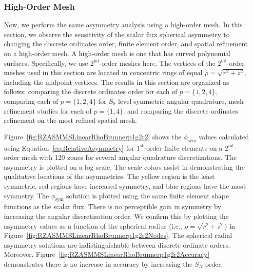\documentclass[12pt]{article}
\begin{document}
\FloatBarrier

\subsubsection{High-Order Mesh}
\label{subsec:HOMesh}
Now, we perform the same asymmetry analysis using a high-order mesh. In this section, we observe the sensitivity of the scalar flux spherical asymmetry to changing the discrete ordinates order, finite element order, and spatial refinement on a high-order mesh. A high-order mesh is one that has curved polynomial surfaces. Specifically, we use $2^\text{nd}$-order meshes here. The vertices of the $2^\text{nd}$-order meshes used in this section are located in concentric rings of equal $\rho=\sqrt{r^2+z^2}$, including the midpoint vertices. The results in this section are organized as follows: comparing the discrete ordinates order for each of $p=\{1,2,4\}$, comparing each of $p=\{1,2,4\}$ for $S_8$ level symmetric angular quadrature, mesh refinement studies for each of $p=\{1,4\}$, and comparing the discrete ordinates refinement on the most refined spatial mesh.

Figure~\ref{fig:RZASMMSLinearRhoBrunnerp1g2r2} shows the $\phi_\text{sym}$ values calculated using Equation~\ref{eq:RelativeAsymmetry} for $1^\text{st}$-order finite elements on a $2^\text{nd}$-order mesh with 120 zones for several angular quadrature discretizations. The asymmetry is plotted on a log scale. The scale colors assist in demonstrating the qualitative locations of the asymmetries. The yellow region is the least symmetric, red regions have increased symmetry, and blue regions have the most symmetry. The $\phi_\text{sym}$ solution is plotted using the same finite element shape functions as the scalar flux. There is no perceptible gain in symmetry by increasing the angular discretization order. We confirm this by plotting the asymmetry values as a function of the spherical radius (i.e., $\rho=\sqrt{r^2+z^2}$) in Figure~\ref{fig:RZASMMSLinearRhoBrunnerp1g2r2Nodes}. The spherical radial asymmetry solutions are indistinguishable between discrete ordinate orders. Moreover, Figure~\ref{fig:RZASMMSLinearRhoBrunnerp1g2r2Accuracy} demonstrates there is no increase in accuracy by increasing the $S_N$ order.
\end{document}
